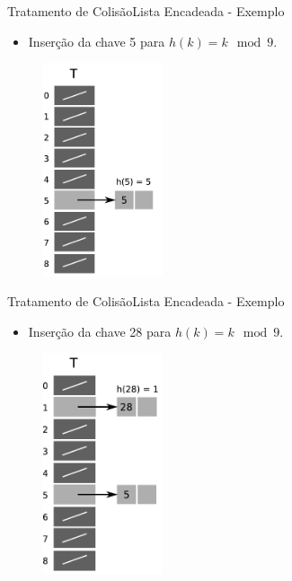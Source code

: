 \documentclass[aspectratio=169]{beamer}
\begin{document}
\begin{frame}{Tratamento de Colisão}{Lista Encadeada - Exemplo}
\begin{itemize}
 \item Inserção da chave 5 para $h(k) = k \mod 9$.
\end{itemize}
\begin{figure}[!h]
  \centering
  \includegraphics[width=100pt]{imagens/ex_encadeada2.png}
  \label{fig_ex_encadeada2}
\end{figure}
\end{frame}

\begin{frame}{Tratamento de Colisão}{Lista Encadeada - Exemplo}
\begin{itemize}
 \item Inserção da chave 28 para $h(k) = k \mod 9$.
\end{itemize}
\begin{figure}[!h]
  \centering
  \includegraphics[width=100pt]{imagens/ex_encadeada3.png}
  \label{fig_ex_encadeada3}
\end{figure}
\end{frame}
\end{document}
